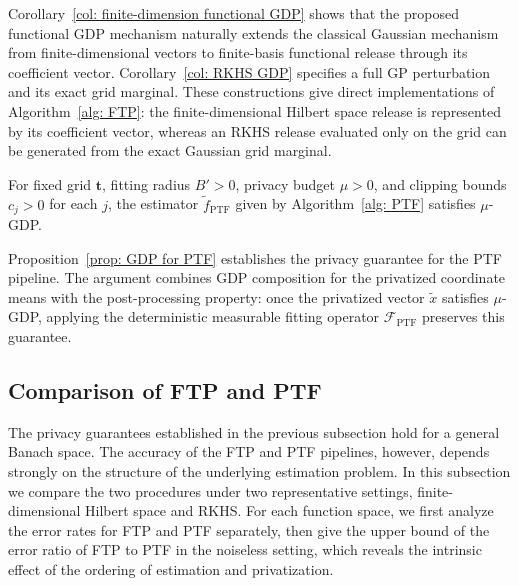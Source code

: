 \documentclass[twoside,11pt]{article}
\begin{document}
Corollary~\ref{col: finite-dimension functional GDP} shows that the proposed functional GDP mechanism naturally extends the classical Gaussian mechanism from finite-dimensional vectors to finite-basis functional release through its coefficient vector. Corollary~\ref{col: RKHS GDP} specifies a full GP perturbation and its exact grid marginal. These constructions give direct implementations of Algorithm~\ref{alg: FTP}: the finite-dimensional Hilbert space release is represented by its coefficient vector, whereas an RKHS release evaluated only on the grid can be generated from the exact Gaussian grid marginal.

\begin{proposition}
For fixed grid $\mathbf t$, fitting radius $B'>0$, privacy budget $\mu>0$, and clipping bounds $c_j>0$ for each $j$, the estimator $\widetilde{f}_{\mathrm{PTF}}$ given by 
Algorithm~\ref{alg: PTF} satisfies $\mu$-GDP.
\label{prop: GDP for PTF}
\end{proposition}
Proposition~\ref{prop: GDP for PTF} establishes the privacy guarantee for the PTF pipeline. The argument combines GDP composition for the privatized coordinate means with the post-processing property: once the privatized vector $\widetilde{x}$ satisfies $\mu$-GDP, applying the deterministic measurable fitting operator $\mathcal F_{\mathrm{PTF}}$ preserves this guarantee.

\subsection{Comparison of FTP and PTF}
\label{subsec: Statistical Comparison}
The privacy guarantees established in the previous subsection hold for a general Banach space. The accuracy of the FTP and PTF pipelines, however, depends strongly on the structure of the underlying estimation problem. In this subsection we compare the two procedures under two representative settings, finite-dimensional Hilbert space and RKHS. For each function space, we first analyze the error rates for FTP and PTF separately, then give the upper bound of the error ratio of FTP to PTF in the noiseless setting, which reveals the intrinsic effect of the ordering of estimation and privatization.
\end{document}
